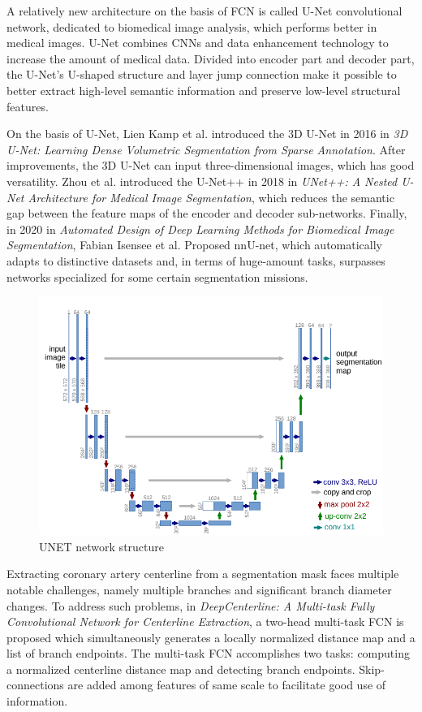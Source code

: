 \documentclass[lang=cn,11pt,a4paper,cite=numbers]{elegantpaper}
\begin{document}
A relatively new architecture on the basis of FCN is called U-Net convolutional network, dedicated to biomedical image analysis, which performs better in medical images. U-Net combines CNNs and data enhancement technology to increase the amount of medical data. Divided into encoder part and decoder part, the U-Net’s U-shaped structure and layer jump connection make it possible to better extract high-level semantic information and preserve low-level structural features. 

On the basis of U-Net, Lien Kamp et al. introduced the 3D U-Net in 2016 in \emph{3D U-Net: Learning Dense Volumetric Segmentation from Sparse Annotation}\cite{11}. After improvements, the 3D U-Net can input three-dimensional images, which has good versatility. Zhou et al. introduced the U-Net++ in 2018 in \emph{UNet++: A Nested U-Net Architecture for Medical Image Segmentation}\cite{12}, which reduces the semantic gap between the feature maps of the encoder and decoder sub-networks. Finally, in 2020 in \emph{Automated Design of Deep Learning Methods for Biomedical Image Segmentation}\cite{13}, Fabian Isensee et al. Proposed nnU-net, which automatically adapts to distinctive datasets and, in terms of huge-amount tasks, surpasses networks specialized for some certain segmentation missions.

\begin{figure}[H]
    \centering
    \includegraphics[scale=0.6]{./image/文献综述/UNET.png}
    \caption{UNET network structure}
    \label{fig:UNET}
\end{figure}

Extracting coronary artery centerline from a segmentation mask faces multiple notable challenges, namely multiple branches and significant branch diameter changes. To address such problems, in \emph{DeepCenterline: A Multi-task Fully Convolutional Network for Centerline Extraction}\cite{14}, a two-head multi-task FCN is proposed which simultaneously generates a locally normalized distance map and a list of branch endpoints. The multi-task FCN accomplishes two tasks: computing a normalized centerline distance map and detecting branch endpoints. Skip-connections are added among features of same scale to facilitate good use of information.
\end{document}
